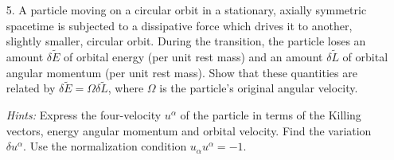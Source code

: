 \documentclass[fleqn]{article}
\begin{document}
\begin{enumerate}
\item[5.] A particle moving on a circular orbit in a stationary, axially symmetric spacetime is subjected to a dissipative force which drives it to another, slightly smaller, circular orbit. During the transition, the particle loses an amount $\delta \tilde{E}$ of orbital energy (per unit rest mass) and an amount $\delta \tilde{L}$ of orbital angular momentum (per unit rest mass). Show that these quantities are related by $\delta\tilde{E} = \Omega \delta\tilde{L}$, where $\Omega$ is the particle's original angular velocity.
  
  {\itshape Hints:} Express the four-velocity $u^\alpha$ of the particle in terms of the Killing vectors, energy angular momentum and orbital velocity. Find the variation $\delta u^\alpha$. Use the normalization condition $u_\alpha u^\alpha = -1$.


\end{enumerate}
\end{document}
